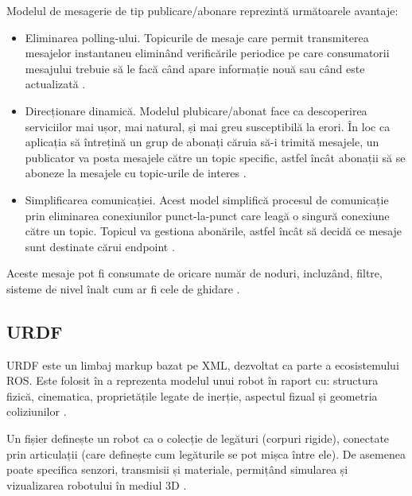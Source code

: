 Modelul de mesagerie de tip publicare/abonare reprezintă următoarele avantaje:
\begin{itemize}
	\item Eliminarea polling-ului. Topicurile de mesaje care permit transmiterea mesajelor instantaneu eliminând verificările periodice pe care consumatorii mesajului trebuie să le facă când apare informație nouă sau când este actualizată \cite{ps}.
	\item Direcționare dinamică. Modelul plubicare/abonat face ca descoperirea serviciilor mai ușor, mai natural, și mai greu susceptibilă la erori. În loc ca aplicația să întrețină un grup de abonați căruia să-i trimită mesajele, un publicator va posta mesajele către un topic specific, astfel încât abonații să se aboneze la mesajele cu topic-urile de interes \cite{ps}.
	\item Simplificarea comunicației. Acest model simplifică procesul de comunicație prin eliminarea conexiunilor punct-la-punct care leagă o singură conexiune către un topic. Topicul va gestiona abonările, astfel încât să decidă ce mesaje sunt destinate cărui endpoint \cite{ps}.
\end{itemize}

Aceste mesaje pot fi consumate de oricare număr de noduri, incluzând, filtre, sisteme de nivel înalt cum ar fi cele de ghidare \cite{ros}. 


\subsection{URDF}
URDF este un limbaj markup bazat pe XML, dezvoltat ca parte a ecosistemului ROS. Este folosit în a reprezenta modelul unui robot în raport cu: structura fizică, cinematica, proprietățile legate de inerție, aspectul fizual și geometria coliziunilor \cite{urdf}.

Un fișier definește un robot ca o colecție de legături (corpuri rigide), conectate prin articulații (care definește cum legăturile se pot mișca între ele). De asemenea poate specifica senzori, transmisii și materiale, permițând simularea și vizualizarea robotului în mediul 3D \cite{urdf}.

